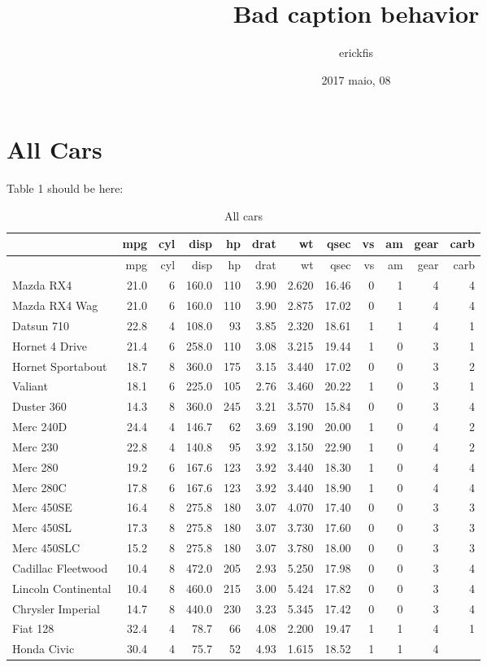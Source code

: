 \documentclass[]{article}
\title{Bad caption behavior}
\author{erickfis}
\date{2017 maio, 08}
\begin{document}
\maketitle

{
\setcounter{tocdepth}{3}
\tableofcontents
}
\section{All Cars}\label{all-cars}

Table 1 should be here:

\begin{longtable}[]{@{}lrrrrrrrrrrr@{}}
\caption{All cars}\tabularnewline
\toprule
& mpg & cyl & disp & hp & drat & wt & qsec & vs & am & gear &
carb\tabularnewline
\midrule
\endfirsthead
\toprule
& mpg & cyl & disp & hp & drat & wt & qsec & vs & am & gear &
carb\tabularnewline
\midrule
\endhead
Mazda RX4 & 21.0 & 6 & 160.0 & 110 & 3.90 & 2.620 & 16.46 & 0 & 1 & 4 &
4\tabularnewline
Mazda RX4 Wag & 21.0 & 6 & 160.0 & 110 & 3.90 & 2.875 & 17.02 & 0 & 1 &
4 & 4\tabularnewline
Datsun 710 & 22.8 & 4 & 108.0 & 93 & 3.85 & 2.320 & 18.61 & 1 & 1 & 4 &
1\tabularnewline
Hornet 4 Drive & 21.4 & 6 & 258.0 & 110 & 3.08 & 3.215 & 19.44 & 1 & 0 &
3 & 1\tabularnewline
Hornet Sportabout & 18.7 & 8 & 360.0 & 175 & 3.15 & 3.440 & 17.02 & 0 &
0 & 3 & 2\tabularnewline
Valiant & 18.1 & 6 & 225.0 & 105 & 2.76 & 3.460 & 20.22 & 1 & 0 & 3 &
1\tabularnewline
Duster 360 & 14.3 & 8 & 360.0 & 245 & 3.21 & 3.570 & 15.84 & 0 & 0 & 3 &
4\tabularnewline
Merc 240D & 24.4 & 4 & 146.7 & 62 & 3.69 & 3.190 & 20.00 & 1 & 0 & 4 &
2\tabularnewline
Merc 230 & 22.8 & 4 & 140.8 & 95 & 3.92 & 3.150 & 22.90 & 1 & 0 & 4 &
2\tabularnewline
Merc 280 & 19.2 & 6 & 167.6 & 123 & 3.92 & 3.440 & 18.30 & 1 & 0 & 4 &
4\tabularnewline
Merc 280C & 17.8 & 6 & 167.6 & 123 & 3.92 & 3.440 & 18.90 & 1 & 0 & 4 &
4\tabularnewline
Merc 450SE & 16.4 & 8 & 275.8 & 180 & 3.07 & 4.070 & 17.40 & 0 & 0 & 3 &
3\tabularnewline
Merc 450SL & 17.3 & 8 & 275.8 & 180 & 3.07 & 3.730 & 17.60 & 0 & 0 & 3 &
3\tabularnewline
Merc 450SLC & 15.2 & 8 & 275.8 & 180 & 3.07 & 3.780 & 18.00 & 0 & 0 & 3
& 3\tabularnewline
Cadillac Fleetwood & 10.4 & 8 & 472.0 & 205 & 2.93 & 5.250 & 17.98 & 0 &
0 & 3 & 4\tabularnewline
Lincoln Continental & 10.4 & 8 & 460.0 & 215 & 3.00 & 5.424 & 17.82 & 0
& 0 & 3 & 4\tabularnewline
Chrysler Imperial & 14.7 & 8 & 440.0 & 230 & 3.23 & 5.345 & 17.42 & 0 &
0 & 3 & 4\tabularnewline
Fiat 128 & 32.4 & 4 & 78.7 & 66 & 4.08 & 2.200 & 19.47 & 1 & 1 & 4 &
1\tabularnewline
Honda Civic & 30.4 & 4 & 75.7 & 52 & 4.93 & 1.615 & 18.52 & 1 & 1 & 4 &

\end{longtable}
\end{document}
